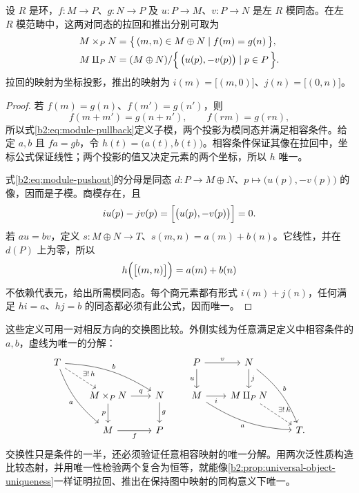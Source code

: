 \begin{proposition}\label{b2:prop:module-pullback-pushout}
	设 \(R\) 是环，\(f:M\to P\)、\(g:N\to P\) 及 \(u:P\to M\)、\(v:P\to N\) 是左 \(R\) 模同态。在左 \(R\) 模范畴中，这两对同态的拉回和推出分别可取为
	\begin{align}
		M\times_PN&=\bigl\{\,(m,n)\in M\oplus N\mid f(m)=g(n)\,\bigr\},\label{b2:eq:module-pullback}\\
		M\amalg_PN&=(M\oplus N)/\Bigl\{\,\bigl(u(p),-v(p)\bigr)\mid p\in P\,\Bigr\}.\label{b2:eq:module-pushout}
	\end{align}
	拉回的映射为坐标投影，推出的映射为 \(i(m)=\bigl[(m,0)\bigr]\)、\(j(n)=\bigl[(0,n)\bigr]\)。
\end{proposition}
\begin{proof}
	若 \(f(m)=g(n)\)、\(f(m')=g(n')\)，则
	\[
		f(m+m')=g(n+n'),\qquad f(rm)=g(rn),
	\]
	所以式\eqref{b2:eq:module-pullback}定义子模，两个投影为模同态并满足相容条件。给定 \(a,b\) 且 \(fa=gb\)，令 \(h(t)=\bigl(a(t),b(t)\bigr)\)。相容条件保证其像在拉回中，坐标公式保证线性；两个投影的值又决定元素的两个坐标，所以 \(h\) 唯一。

	式\eqref{b2:eq:module-pushout}的分母是同态 \(d:P\rightarrow M\oplus N\)、\(p\mapsto\bigl(u(p),-v(p)\bigr)\) 的像，因而是子模。商模存在，且
	\[
		iu(p)-jv(p)=\Bigl[\bigl(u(p),-v(p)\bigr)\Bigr]=0.
	\]
	若 \(au=bv\)，定义 \(s:M\oplus N\rightarrow T\)、\(s(m,n)=a(m)+b(n)\)。它线性，并在 \(d(P)\) 上为零，所以
	\[
		h\Bigl(\bigl[(m,n)\bigr]\Bigr)=a(m)+b(n)
	\]
	不依赖代表元，给出所需模同态。每个商元素都有形式 \(i(m)+j(n)\)，任何满足 \(hi=a\)、\(hj=b\) 的同态都必须有此公式，因而唯一。
\end{proof}

这些定义可用一对相反方向的交换图比较。外侧实线为任意满足定义中相容条件的 \(a,b\)，虚线为唯一的分解：
\[
	\begin{tikzcd}[column sep=2.1em,row sep=2em]
		T\arrow[rd,dashed,"\exists!\,h"]\arrow[rdd,bend right=14,"a"']\arrow[rrd,bend left=14,"b"]&&\\
		&M\times_PN\arrow[r,"q"]\arrow[d,"p"']&N\arrow[d,"g"]\\
		&M\arrow[r,"f"']&P
	\end{tikzcd}
	\qquad
	\begin{tikzcd}[column sep=2.1em,row sep=2em]
		P\arrow[r,"v"]\arrow[d,"u"']&N\arrow[d,"j"]\arrow[ddr,bend left=14,"b"]&\\
		M\arrow[r,"i"']\arrow[drr,bend right=14,"a"']&M\amalg_PN\arrow[dr,dashed,"\exists!\,h"]&\\
		&&T.
	\end{tikzcd}
\]
交换性只是条件的一半，还必须验证任意相容映射的唯一分解。用两次泛性质构造比较态射，并用唯一性检验两个复合为恒等，就能像\cref{b2:prop:universal-object-uniqueness}一样证明拉回、推出在保持图中映射的同构意义下唯一。

